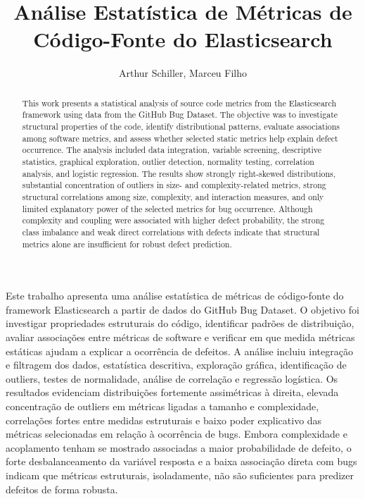 \documentclass[12pt]{article}
\title{Análise Estatística de Métricas de Código-Fonte do Elasticsearch}
\author{Arthur Schiller\inst{1}, Marceu Filho\inst{1}}
\begin{document}
\maketitle

\begin{abstract}
This work presents a statistical analysis of source code metrics from the Elasticsearch framework using data from the GitHub Bug Dataset. The objective was to investigate structural properties of the code, identify distributional patterns, evaluate associations among software metrics, and assess whether selected static metrics help explain defect occurrence. The analysis included data integration, variable screening, descriptive statistics, graphical exploration, outlier detection, normality testing, correlation analysis, and logistic regression. The results show strongly right-skewed distributions, substantial concentration of outliers in size- and complexity-related metrics, strong structural correlations among size, complexity, and interaction measures, and only limited explanatory power of the selected metrics for bug occurrence. Although complexity and coupling were associated with higher defect probability, the strong class imbalance and weak direct correlations with defects indicate that structural metrics alone are insufficient for robust defect prediction.
\end{abstract}

\begin{resumo}
Este trabalho apresenta uma análise estatística de métricas de código-fonte do framework Elasticsearch a partir de dados do GitHub Bug Dataset. O objetivo foi investigar propriedades estruturais do código, identificar padrões de distribuição, avaliar associações entre métricas de software e verificar em que medida métricas estáticas ajudam a explicar a ocorrência de defeitos. A análise incluiu integração e filtragem dos dados, estatística descritiva, exploração gráfica, identificação de outliers, testes de normalidade, análise de correlação e regressão logística. Os resultados evidenciam distribuições fortemente assimétricas à direita, elevada concentração de outliers em métricas ligadas a tamanho e complexidade, correlações fortes entre medidas estruturais e baixo poder explicativo das métricas selecionadas em relação à ocorrência de bugs. Embora complexidade e acoplamento tenham se mostrado associadas a maior probabilidade de defeito, o forte desbalanceamento da variável resposta e a baixa associação direta com bugs indicam que métricas estruturais, isoladamente, não são suficientes para predizer defeitos de forma robusta.
\end{resumo}
\end{document}
